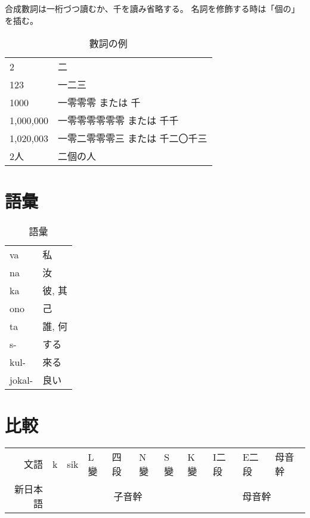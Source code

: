 \documentclass[]{jlreq}
\begin{document}
合成數詞は一桁づつ讀むか、千を讀み省略する。
名詞を修飾する時は「個の」を插む。

\begin{table}[h]\centering
  \begin{tabular}{ll}
    2         & 二                               \\
    123       & 一二三                           \\
    1000      & 一零零零 または 千               \\
    1,000,000 & 一零零零零零零 または 千千       \\
    1,020,003 & 一零二零零零三 または 千二〇千三 \\
    2人       & 二個の人
  \end{tabular}
  \caption{數詞の例}
\end{table}

\section{語彙}

\begin{table}[h]\centering
  \begin{tabular}{ll}
    va     & 私     \\
    na     & 汝     \\
    ka     & 彼, 其 \\
    ono    & 己     \\
    ta     & 誰, 何 \\
    s-     & する   \\
    kul-   & 來る   \\
    jokal- & 良い
  \end{tabular}
  \caption{語彙}
\end{table}

\section{比較}

\begin{table}[h]\centering
  \begin{tabular}{r|lllllll|lll}
    文語     & k                           & sik                        & L變 & 四段 & N變 & S變 & K變 & I二段 & E二段 & 母音幹 \\
    新日本語 & \multicolumn{7}{c|}{子音幹} & \multicolumn{3}{c}{母音幹}
  \end{tabular}
\end{table}
\end{document}
